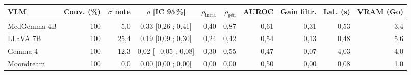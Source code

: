\begin{tabular}{lrrcrrrrrr}
\toprule
VLM & Couv. (\%) & $\sigma$ note & $\rho$ [IC 95\,\%] & $\rho_\text{intra}$ & $\rho_\text{gén}$ & AUROC & Gain filtr. & Lat. (s) & VRAM (Go) \\
\midrule
MedGemma 4B & 100 & 5,0 & 0,33 [0,26 ; 0,41] & 0,40 & 0,87 & 0,61 & 0,31 & 0,53 & 3,4 \\
LLaVA 7B & 100 & 25,4 & 0,19 [0,09 ; 0,30] & 0,24 & 0,42 & 0,54 & 0,13 & 0,48 & 5,6 \\
Gemma 4 & 100 & 12,3 & 0,02 [$-$0,05 ; 0,08] & 0,30 & 0,55 & 0,47 & 0,07 & 4,03 & 4,0 \\
Moondream & 100 & 0,0 & 0,00 [0,00 ; 0,00] & 0,00 & 0,00 & 0,50 & 0,00 & 0,08 & 1,0 \\
\bottomrule
\end{tabular}
